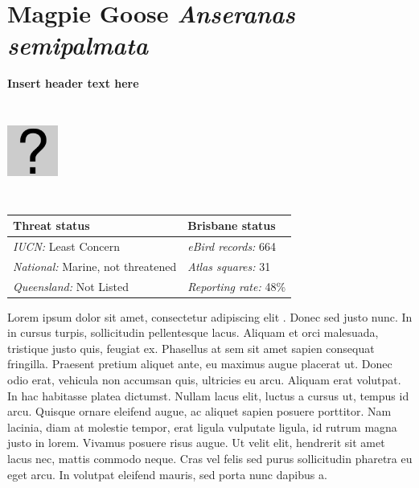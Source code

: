 \documentclass[12pt,openany,oneside]{book}
\let\origfigure\figure
\let\endorigfigure\endfigure
\renewenvironment{figure}[1][2] {
  \expandafter\origfigure\expandafter[H]
} {
  \endorigfigure
}
\theoremstyle{definition}
\theoremstyle{definition}
\theoremstyle{definition}
\theoremstyle{remark}
\begin{document}
\clearpage

\hypertarget{magpie-goose-anseranas-semipalmata}{%
\section{\texorpdfstring{Magpie Goose \emph{Anseranas
semipalmata}}{Magpie Goose Anseranas semipalmata}}\label{magpie-goose-anseranas-semipalmata}}


\textbf{Insert header text here}

\begin{figure}
\centering
\includegraphics[width=63px,height=120px]{assets/profile/missing.png}
\caption{Insert caption here.}
\end{figure}

\begin{tabu} to 
\toprule
Threat status & Brisbane status\\
\midrule
\textit{IUCN:} Least Concern & \textit{eBird records:} 664\\
\textit{National:} Marine, not threatened & \textit{Atlas squares:} 31\\
\textit{Queensland:} Not Listed & \textit{Reporting rate:} 48\%\\
\bottomrule
\end{tabu}

Lorem ipsum dolor sit amet, consectetur adipiscing elit
\citep{rexample1, rexample2, rexample3}. Donec sed justo nunc. In in
cursus turpis, sollicitudin pellentesque lacus. Aliquam et orci
malesuada, tristique justo quis, feugiat ex. Phasellus at sem sit amet
sapien consequat fringilla. Praesent pretium aliquet ante, eu maximus
augue placerat ut. Donec odio erat, vehicula non accumsan quis,
ultricies eu arcu. Aliquam erat volutpat. In hac habitasse platea
dictumst. Nullam lacus elit, luctus a cursus ut, tempus id arcu. Quisque
ornare eleifend augue, ac aliquet sapien posuere porttitor. Nam lacinia,
diam at molestie tempor, erat ligula vulputate ligula, id rutrum magna
justo in lorem. Vivamus posuere risus augue. Ut velit elit, hendrerit
sit amet lacus nec, mattis commodo neque. Cras vel felis sed purus
sollicitudin pharetra eu eget arcu. In volutpat eleifend mauris, sed
porta nunc dapibus a.
\end{document}
